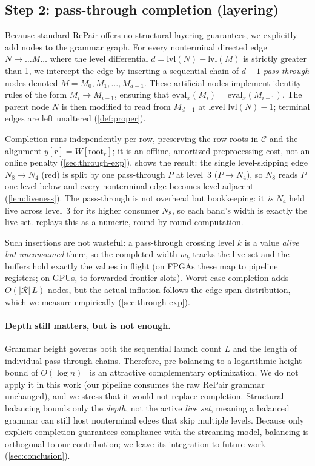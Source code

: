\documentclass[twoside,leqno,twocolumn]{article}
\begin{document}
\subsection{Step 2: pass-through completion (layering)}
\label{sec:through-layer}
Because standard RePair offers no structural layering guarantees, we explicitly add nodes to the grammar graph. For every nonterminal directed edge $N\to\dots M\dots$ where the level differential $d=\mathrm{lvl}(N)-\mathrm{lvl}(M)$ is strictly greater than 1, we intercept the edge by inserting a sequential chain of $d-1$ \emph{pass-through} nodes denoted $M=M_0,M_1,\dots,M_{d-1}$. These artificial nodes implement identity rules of the form $M_i\to M_{i-1}$, ensuring that $\mathrm{eval}_x(M_i)=\mathrm{eval}_x(M_{i-1})$. The parent node $N$ is then modified to read from $M_{d-1}$ at level $\mathrm{lvl}(N)-1$; terminal edges are left unaltered (\cref{def:proper}). 

Completion runs independently per row, preserving the row roots in $\mathcal{C}$ and the alignment $y[r]=W[\text{root}_r]$; it is an offline, amortized preprocessing cost, not an online penalty (\cref{sec:through-exp}).  shows the result: the single level-skipping edge $N_8\!\to\!N_4$ (red) is split by one pass-through $P$ at level~3 ($P\to N_4$), so $N_8$ reads $P$ one level below and every nonterminal edge becomes level-adjacent (\cref{lem:liveness}). The pass-through is not overhead but bookkeeping: it \emph{is} $N_4$ held live across level~3 for its higher consumer $N_8$, so each band's width is exactly the live set.  replays this as a numeric, round-by-round computation.

Such insertions are not wasteful: a pass-through crossing level $k$ is a value \emph{alive but unconsumed} there, so the completed width $w_k$ tracks the live set and the buffers hold exactly the values in flight (on FPGAs these map to pipeline registers; on GPUs, to forwarded frontier slots). Worst-case completion adds $O(|\mathcal{R}|\,L)$ nodes, but the actual inflation follows the edge-span distribution, which we measure empirically (\cref{sec:through-exp}).

\paragraph{Depth still matters, but is not enough.}

Grammar height governs both the sequential launch count $L$ and the length of individual pass-through chains. Therefore, pre-balancing to a logarithmic height bound of $O(\log n)$~\cite{ganardi,balancing-urbina} is an attractive complementary optimization. We do not apply it in this work (our pipeline consumes the raw RePair grammar unchanged), and we stress that it would not replace completion. Structural balancing bounds only the \emph{depth}, not the active \emph{live set}, meaning a balanced grammar can still host nonterminal edges that skip multiple levels. Because only explicit completion guarantees compliance with the streaming model, balancing is orthogonal to our contribution; we leave its integration to future work (\cref{sec:conclusion}).
\end{document}
